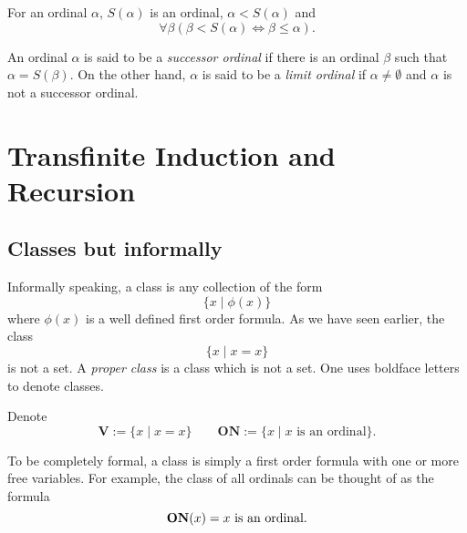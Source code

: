 \begin{lemma}
    For an ordinal $\alpha$, $S(\alpha)$ is an ordinal, $\alpha < S(\alpha)$ and 
    \begin{equation*}
        \forall\beta(\beta < S(\alpha) \iff \beta\le\alpha).
    \end{equation*}
\end{lemma}

\begin{definition}
    An ordinal $\alpha$ is said to be a \emph{successor ordinal} if there is an ordinal $\beta$ such that $\alpha = S(\beta)$. On the other hand, $\alpha$ is said to be a \emph{limit ordinal} if $\alpha\ne\emptyset$ and $\alpha$ is not a successor ordinal.
\end{definition}

\section{Transfinite Induction and Recursion}

\subsection{Classes but informally}

Informally speaking, a class is any collection of the form 
\begin{equation*}
    \{x\mid \phi(x)\}
\end{equation*}
where $\phi(x)$ is a well defined first order formula. As we have seen earlier, the class 
\begin{equation*}
    \{x\mid x = x\}
\end{equation*}
is not a set. A \emph{proper class} is a class which is not a set. One uses boldface letters to denote classes. 

\begin{definition}
    Denote 
    \begin{equation*}
        \mathbf{V} := \{x\mid x = x\}\qquad\mathbf{ON} := \{x\mid x\text{ is an ordinal}\}.
    \end{equation*}
\end{definition}

To be completely formal, a class is simply a first order formula with one or more free variables. For example, the class of all ordinals can be thought of as the formula 
\begin{equation*}
    \mathbf{ON}(x) = x \text{ is an ordinal.}
\end{equation*}

